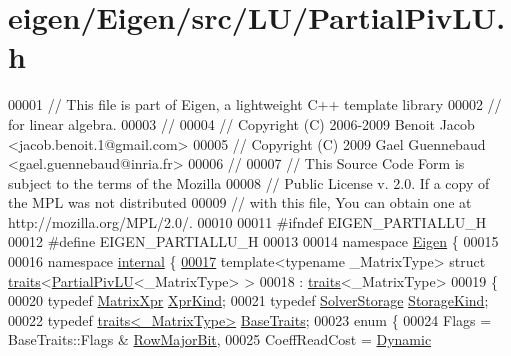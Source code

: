 \hypertarget{eigen_2_eigen_2src_2_l_u_2_partial_piv_l_u_8h_source}{}\section{eigen/\+Eigen/src/\+L\+U/\+Partial\+Piv\+LU.h}
\label{eigen_2_eigen_2src_2_l_u_2_partial_piv_l_u_8h_source}

\begin{DoxyCode}
00001 \textcolor{comment}{// This file is part of Eigen, a lightweight C++ template library}
00002 \textcolor{comment}{// for linear algebra.}
00003 \textcolor{comment}{//}
00004 \textcolor{comment}{// Copyright (C) 2006-2009 Benoit Jacob <jacob.benoit.1@gmail.com>}
00005 \textcolor{comment}{// Copyright (C) 2009 Gael Guennebaud <gael.guennebaud@inria.fr>}
00006 \textcolor{comment}{//}
00007 \textcolor{comment}{// This Source Code Form is subject to the terms of the Mozilla}
00008 \textcolor{comment}{// Public License v. 2.0. If a copy of the MPL was not distributed}
00009 \textcolor{comment}{// with this file, You can obtain one at http://mozilla.org/MPL/2.0/.}
00010 
00011 \textcolor{preprocessor}{#ifndef EIGEN\_PARTIALLU\_H}
00012 \textcolor{preprocessor}{#define EIGEN\_PARTIALLU\_H}
00013 
00014 \textcolor{keyword}{namespace }\hyperlink{namespace_eigen}{Eigen} \{
00015 
00016 \textcolor{keyword}{namespace }\hyperlink{namespaceinternal}{internal} \{
\hyperlink{struct_eigen_1_1internal_1_1traits_3_01_partial_piv_l_u_3_01___matrix_type_01_4_01_4}{00017} \textcolor{keyword}{template}<\textcolor{keyword}{typename} \_MatrixType> \textcolor{keyword}{struct }\hyperlink{struct_eigen_1_1internal_1_1traits}{traits}<\hyperlink{group___l_u___module_class_eigen_1_1_partial_piv_l_u}{PartialPivLU}<\_MatrixType> >
00018  : \hyperlink{struct_eigen_1_1internal_1_1traits}{traits}<\_MatrixType>
00019 \{
00020   \textcolor{keyword}{typedef} \hyperlink{struct_eigen_1_1_matrix_xpr}{MatrixXpr} \hyperlink{struct_eigen_1_1_matrix_xpr}{XprKind};
00021   \textcolor{keyword}{typedef} \hyperlink{struct_eigen_1_1_solver_storage}{SolverStorage} \hyperlink{struct_eigen_1_1_solver_storage}{StorageKind};
00022   \textcolor{keyword}{typedef} \hyperlink{struct_eigen_1_1internal_1_1traits}{traits<\_MatrixType>} \hyperlink{struct_eigen_1_1internal_1_1traits}{BaseTraits};
00023   \textcolor{keyword}{enum} \{
00024     Flags = BaseTraits::Flags & \hyperlink{group__flags_gae4f56c2a60bbe4bd2e44c5b19cbe8762}{RowMajorBit},
00025     CoeffReadCost = \hyperlink{namespace_eigen_ad81fa7195215a0ce30017dfac309f0b2}{Dynamic}

\end{DoxyCode}
